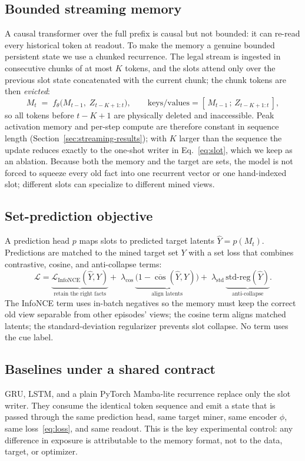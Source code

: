\subsection{Bounded streaming memory}
\label{sec:streaming}
A causal transformer over the full prefix is causal but not bounded: it can
re-read every historical token at readout.  To make the memory a genuine
bounded persistent state we use a chunked recurrence.  The legal stream is
ingested in consecutive chunks of at most $K$ tokens, and the slots attend only
over the previous slot state concatenated with the current chunk; the chunk
tokens are then \emph{evicted}:
\begin{equation}
M_t \;=\; f_\theta\big(M_{t-1},\; Z_{t-K+1:t}\big),
\qquad
\text{keys/values} = [\,M_{t-1}\,;\,Z_{t-K+1:t}\,],
\label{eq:streaming}
\end{equation}
so all tokens before $t-K+1$ are physically deleted and inaccessible.  Peak
activation memory and per-step compute are therefore constant in sequence
length (Section~\ref{sec:streaming-results}); with $K$ larger than the sequence
the update reduces exactly to the one-shot writer in Eq.~\eqref{eq:slot}, which
we keep as an ablation.  Because both the memory and the target are sets, the
model is not forced to squeeze every old fact into one recurrent vector or one
hand-indexed slot; different slots can specialize to different mined views.

\subsection{Set-prediction objective}
A prediction head $p$ maps slots to predicted target latents
$\hat{Y}=p(M_t)$.  Predictions are matched to the mined target set $Y$ with a
set loss that combines contrastive, cosine, and anti-collapse terms:
\begin{equation}
\mathcal{L}
= \underbrace{\mathcal{L}_{\text{InfoNCE}}(\hat{Y},Y)}_{\text{retain the right facts}}
+\; \lambda_{\cos}\, \underbrace{\big(1-\overline{\cos}(\hat{Y},Y)\big)}_{\text{align latents}}
+\; \lambda_{\text{std}}\, \underbrace{\mathrm{std\text{-}reg}(\hat{Y})}_{\text{anti-collapse}} .
\label{eq:loss}
\end{equation}
The InfoNCE term uses in-batch negatives so the memory must keep the correct old
view separable from other episodes' views; the cosine term aligns matched
latents; the standard-deviation regularizer prevents slot collapse.  No term
uses the cue label.

\subsection{Baselines under a shared contract}
GRU, LSTM, and a plain PyTorch Mamba-lite recurrence replace only the slot
writer.  They consume the identical token sequence and emit a state that is
passed through the same prediction head, same target miner, same encoder $\phi$,
same loss~\eqref{eq:loss}, and same readout.  This is the key experimental
control: any difference in exposure is attributable to the memory format, not to
the data, target, or optimizer.

